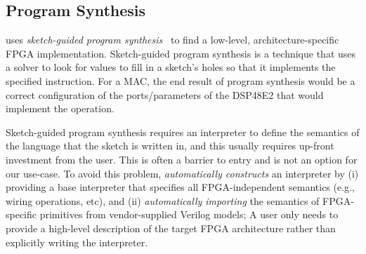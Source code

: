   


\subsection{Program Synthesis}
\lr uses \textit{sketch-guided program synthesis}~\cite{??}
  to find a low-level, architecture-specific
  FPGA implementation.
Sketch-guided program synthesis is a
  technique that uses a solver
  to look for values to fill in
  a sketch's holes so that it
  implements the specified instruction. For a MAC,
  the end result of program synthesis would be a
  correct configuration of the ports/parameters of
  the DSP48E2 that would implement the operation.

Sketch-guided program synthesis
  requires an interpreter to define
  the semantics of the language that
  the sketch is written in, and
  this usually requires up-front
  investment from
  the user.
This is often a barrier to
  entry and is not an option
  for our use-case.
To avoid this problem, \lr
  \textit{automatically constructs}
  an interpreter by
  (i) providing a base interpreter
  that specifies all
  FPGA-independent semantics
  (e.g., wiring operations, etc),
  and
  (ii) \textit{automatically importing}
  the semantics of FPGA-specific primitives
  from vendor-supplied Verilog models;
A user only
  needs to provide
  a high-level
  description of 
  the target FPGA
  architecture rather
  than explicitly
  writing the interpreter.


